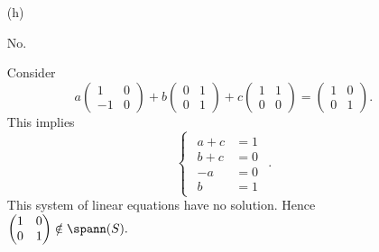 \begin{Exercise}
\begin{enumerate}[(a)]
		\item[(h)]
		\begin{answer}
			No.
		\end{answer}
		\begin{solution}
			Consider
			$$
			a\begin{pmatrix}
			1 & 0 \\
			-1 & 0
			\end{pmatrix} + b\begin{pmatrix}
			0 & 1 \\
			0 & 1
			\end{pmatrix} + c\begin{pmatrix}
			1 & 1 \\
			0 & 0
			\end{pmatrix} = \begin{pmatrix}
			1 & 0 \\
			0 & 1
			\end{pmatrix}.
			$$
			This implies
			$$
			\begin{cases}
			\begin{aligned}
			a+c &= 1 \\
			b+c &= 0 \\
			-a &= 0 \\
			b &= 1
			\end{aligned}
			\end{cases}.
			$$
			This system of linear equations have no solution. Hence 
			$
			\begin{pmatrix}
			1 & 0 \\
			0 & 1
			\end{pmatrix} \notin \spann(S).
			$
		\end{solution}
	\end{enumerate}
\end{Exercise}